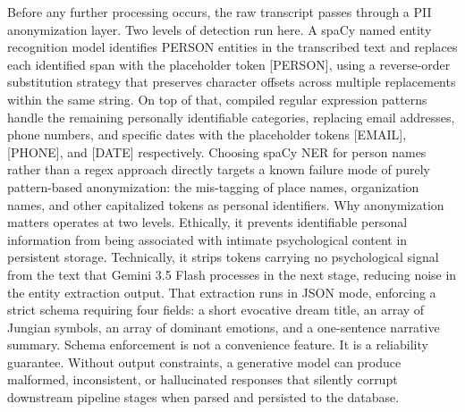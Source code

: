 \documentclass[12pt,a4paper]{report}
\begin{document}
Before any further processing occurs, the raw transcript passes through a PII anonymization layer. Two levels of detection run here. A spaCy named entity recognition model identifies PERSON entities in the transcribed text and replaces each identified span with the placeholder token [PERSON], using a reverse-order substitution strategy that preserves character offsets across multiple replacements within the same string. On top of that, compiled regular expression patterns handle the remaining personally identifiable categories, replacing email addresses, phone numbers, and specific dates with the placeholder tokens [EMAIL], [PHONE], and [DATE] respectively. Choosing spaCy NER for person names rather than a regex approach directly targets a known failure mode of purely pattern-based anonymization: the mis-tagging of place names, organization names, and other capitalized tokens as personal identifiers. Why anonymization matters operates at two levels. Ethically, it prevents identifiable personal information from being associated with intimate psychological content in persistent storage. Technically, it strips tokens carrying no psychological signal from the text that Gemini 3.5 Flash processes in the next stage, reducing noise in the entity extraction output. That extraction runs in JSON mode, enforcing a strict schema requiring four fields: a short evocative dream title, an array of Jungian symbols, an array of dominant emotions, and a one-sentence narrative summary. Schema enforcement is not a convenience feature. It is a reliability guarantee. Without output constraints, a generative model can produce malformed, inconsistent, or hallucinated responses that silently corrupt downstream pipeline stages when parsed and persisted to the database.
\end{document}
